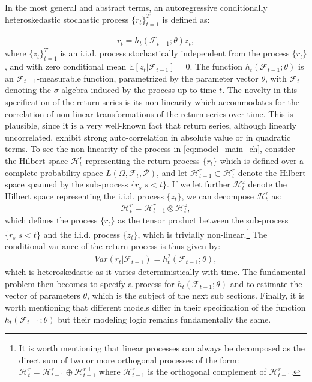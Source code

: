 \documentclass{article} %
\begin{document}
	In the most general and abstract terms, an autoregressive conditionally heteroskedastic stochastic process $\{r_t\}_{t=1}^T$ is defined as:
	
	\begin{align}
		r_t = h_t(\mathcal{F}_{t-1};\theta) z_t, \label{eq:model_main_ch}
	\end{align}
	where $\{z_t\}_{t=1}^T$ is an i.i.d. process stochastically independent from the process $\{r_t\}$, and with zero conditional mean $\mathbb{E}[z_t|\mathcal{F}_{t-1}] = 0$. The function $h_t(\mathcal{F}_{t-1};\theta)$ is an $\mathcal{F}_{t-1}$-measurable function, parametrized by the parameter vector $\theta$, with $\mathcal{F}_{t}$ denoting the $\sigma$-algebra induced by the process up to time $t$. The novelty in this specification of the return series is its non-linearity which accommodates for the correlation of non-linear transformations of the return series over time. This is plausible, since it is a very well-known fact that return series, although linearly uncorrelated, exhibit strong auto-correlation in absolute value or in quadratic terms. To see the non-linearity of the process in \eqref{eq:model_main_ch}, consider the Hilbert space $\mathcal{H}_t^r$ representing the return process $\{r_t\}$ which is defined over a complete probability space $L(\Omega, \mathcal{F}_t, \mathcal{P})$, and let $\mathcal{H}_{t-1}^r \subset \mathcal{H}_t^r$ denote the Hilbert space spanned by the sub-process $\{r_s|s < t\}$. If we let further $\mathcal{H}_t^z$ denote the Hilbert space representing the i.i.d. process $\{z_t\}$, we can decompose $\mathcal{H}_t^r$ as:
	\begin{align}
		\mathcal{H}_t^r = \mathcal{H}_{t-1}^r \otimes \mathcal{H}_t^z,
	\end{align}
	which defines the process $\{r_t\}$ as the tensor product between the sub-process $\{r_s | s<t\}$ and the i.i.d. process $\{z_t\}$, which is trivially non-linear.\footnote{It is worth mentioning that linear processes can always be decomposed as the direct sum of two or more orthogonal processes of the form: $\mathcal{H}_t^r = \mathcal{H}_{t-1}^r \oplus \mathcal{H}_{t-1}^{r\perp}$ where $\mathcal{H}_{t-1}^{r\perp}$ is the orthogonal complement of $\mathcal{H}_{t-1}^r$.} The conditional variance of the return process is thus given by:
	\begin{align}
		Var\left( r_t | \mathcal{F}_{t-1} \right) = h_t^2(\mathcal{F}_{t-1};\theta), \label{eq:cond_var_function}
	\end{align}
	which is heteroskedastic as it varies deterministically with time. The fundamental problem then becomes to specify a process for $h_t(\mathcal{F}_{t-1};\theta)$ and to estimate the vector of parameters $\theta$, which is the subject of the next sub sections. Finally, it is worth mentioning that different models differ in their specification of the function $h_t(\mathcal{F}_{t-1};\theta)$ but their modeling logic remains fundamentally the same. 
	
\end{document}
